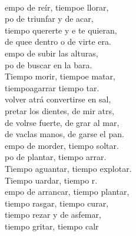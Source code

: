 \begin{cancion}%
	     \\
	empo de reír, tiempoe llorar,\\
	po de triunfar y de acar,\\
	tiempo  quererte y e te quieran,\\
	de quee dentro o de virte era.\\
	\jump
	empo de subir las alturas,\\
	po de buscar en la bara.\\
	Tiempo  morir, tiempoe matar,\\
	tiempoagarrar tiempo  tar.\\
	\jump
	 volver atrá convertirse en sal,\\
	pretar los dientes, de mir atrs,\\
	de volrse fuerte, de grar al mar,\\
	de vaclas manos, de garse el pan.\\
	\jump
	empo de morder, tiempo  soltar.\\
	po de plantar, tiempo  arrar.\\
	Tiempo  aguantar, tiempo  explotar.\\
	Tiempo uardar, tiempo  r.\\
	\jump
	empo de arrancar, tiempo  plantar,\\
	tiempo  rasgar, tiempo curar,\\
	tiempo  rezar y de asfemar,\\
	tiempo  gritar, tiempo  calr\jump\\
	\begin{chorus}%

\end{chorus}
\end{cancion}

